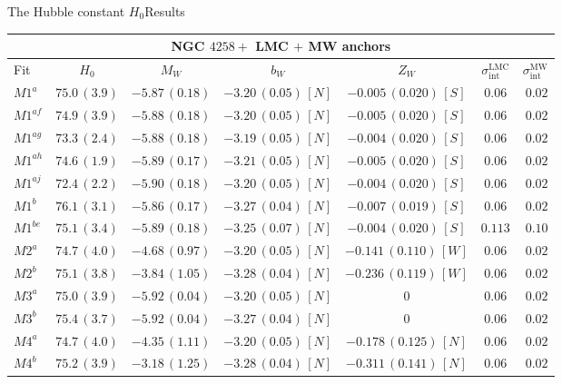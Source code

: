 \documentclass{beamer}
\newcommand{\intt}{\mathrm{int}}
\newcommand{\LMC}{\mathrm{LMC}}
\newcommand{\MW}{\mathrm{MW}}
\begin{document}
\begin{frame}{The Hubble constant $H_0$}{Results}
\begin{table}[tbp]
\centering
\begin{tabular}{@{}lcccccr}
\hline
\multicolumn{7}{c}{NGC $4258 +$ LMC $+$ MW anchors} \\
\hline
Fit & $H_0$ & $M_W$ & $b_W$ & $Z_W$ &$\sigma_{\intt}^{\LMC}$ & $\sigma_{\intt}^{\MW}$\\
\hline
$M1^{a}$ & $75.0\,(3.9)$ & $-5.87\,(0.18)$ & $-3.20\,(0.05)\,[N]$ & $-0.005\,(0.020)\,[S]$ & $0.06$& $0.02$ \\
$M1^{af}$ & $74.9\,(3.9)$ & $-5.88\,(0.18)$ & $-3.20\,(0.05)\,[N]$ & $-0.005\,(0.020)\,[S]$ & $0.06$& $0.02$ \\
$M1^{ag}$ & $73.3\,(2.4)$ & $-5.88\,(0.18)$ & $-3.19\,(0.05)\,[N]$ & $-0.004\,(0.020)\,[S]$ & $0.06$& $0.02$ \\
$M1^{ah}$ & $74.6\,(1.9)$ & $-5.89\,(0.17)$ & $-3.21\,(0.05)\,[N]$ & $-0.005\,(0.020)\,[S]$ & $0.06$& $0.02$ \\
$M1^{aj}$ & $72.4\,(2.2)$ & $-5.90\,(0.18)$ & $-3.20\,(0.05)\,[N]$ & $-0.004\,(0.020)\,[S]$ & $0.06$& $0.02$ \\
$M1^{b}$ & $76.1\,(3.1)$ & $-5.86\,(0.17)$ & $-3.27\,(0.04)\,[N]$ & $-0.007\,(0.019)\,[S]$ & $0.06$ & $0.02$ \\
$M1^{be}$ & $75.1\,(3.4)$ & $-5.89\,(0.18)$ & $-3.25\,(0.07)\,[N]$ & $-0.004\,(0.020)\,[S]$ & $0.113$ & $0.10$ \\
$M2^{a}$ & $74.7\,(4.0)$ & $-4.68\,(0.97)$ & $-3.20\,(0.05)\,[N] $ & $-0.141\,(0.110)\,[W] $ & $0.06 $ & $0.02 $ \\
$M2^{b}$ & $ 75.1\,(3.8)$ & $-3.84\,(1.05)$ & $-3.28\,(0.04)\,[N]$ & $-0.236\,(0.119)\,[W]$ & $0.06$ & $0.02$ \\
$M3^{a}$ & $75.0\,(3.9)$ & $-5.92\,(0.04)$ & $-3.20\,(0.05)\,[N]$ & $0$ & $0.06$ & $0.02$ \\
$M3^{b}$ & $75.4\,(3.7)$ & $-5.92\,(0.04)$ & $-3.27\,(0.04)\,[N]$ & $ 0 $ & $0.06$ & $0.02$ \\
$M4^{a}$ & $74.7\,(4.0)$ & $-4.35\,(1.11)$ & $-3.20\,(0.05)\,[N]$ & $-0.178\,(0.125)\,[N]$ & $0.06$ & $0.02$ \\
$M4^{b}$ & $75.2\,(3.9)$ & $-3.18\,(1.25)$ & $-3.28\,(0.04)\,[N]$ & $-0.311\,(0.141)\,[N]$ & $0.06$ & $0.02$ \\
\hline

\end{tabular}


\end{table}
\end{frame}
\end{document}
